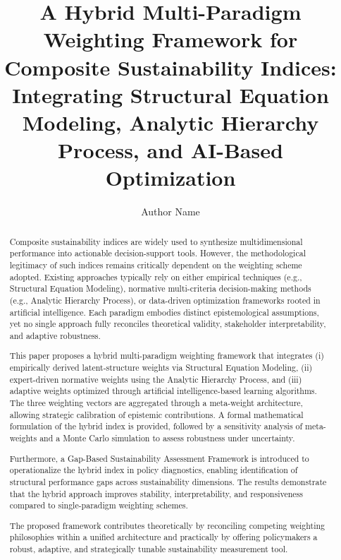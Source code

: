 \documentclass[11pt,a4paper]{article}
\begin{document}
\title{A Hybrid Multi-Paradigm Weighting Framework for Composite Sustainability Indices: Integrating Structural Equation Modeling, Analytic Hierarchy Process, and AI-Based Optimization}

\author{Author Name}

\date{}

\maketitle
\begin{abstract}

Composite sustainability indices are widely used to synthesize multidimensional performance into actionable decision-support tools. However, the methodological legitimacy of such indices remains critically dependent on the weighting scheme adopted. Existing approaches typically rely on either empirical techniques (e.g., Structural Equation Modeling), normative multi-criteria decision-making methods (e.g., Analytic Hierarchy Process), or data-driven optimization frameworks rooted in artificial intelligence. Each paradigm embodies distinct epistemological assumptions, yet no single approach fully reconciles theoretical validity, stakeholder interpretability, and adaptive robustness.

This paper proposes a hybrid multi-paradigm weighting framework that integrates (i) empirically derived latent-structure weights via Structural Equation Modeling, (ii) expert-driven normative weights using the Analytic Hierarchy Process, and (iii) adaptive weights optimized through artificial intelligence-based learning algorithms. The three weighting vectors are aggregated through a meta-weight architecture, allowing strategic calibration of epistemic contributions. A formal mathematical formulation of the hybrid index is provided, followed by a sensitivity analysis of meta-weights and a Monte Carlo simulation to assess robustness under uncertainty.

Furthermore, a Gap-Based Sustainability Assessment Framework is introduced to operationalize the hybrid index in policy diagnostics, enabling identification of structural performance gaps across sustainability dimensions. The results demonstrate that the hybrid approach improves stability, interpretability, and responsiveness compared to single-paradigm weighting schemes.

The proposed framework contributes theoretically by reconciling competing weighting philosophies within a unified architecture and practically by offering policymakers a robust, adaptive, and strategically tunable sustainability measurement tool.

\end{abstract}
\end{document}
